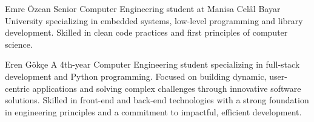\documentclass[twoside,a4paper,journal]{IEEEtran}
\begin{document}
%

\begin{IEEEbiography}{Emre Özcan}
Senior Computer Engineering student at Manisa Celâl Bayar University
specializing in embedded systems, low-level programming and library development.
Skilled in clean code practices and first principles of computer science.
\end{IEEEbiography}

\begin{IEEEbiography}{Eren Gökçe}
A 4th-year Computer Engineering student specializing in full-stack development
and Python programming.
Focused on building dynamic, user-centric applications and solving complex
challenges through innovative software
solutions.
Skilled in front-end and back-end technologies with a strong foundation in
engineering principles and a commitment to
impactful, efficient development.
\end{IEEEbiography}

\newpage %
\end{document}
